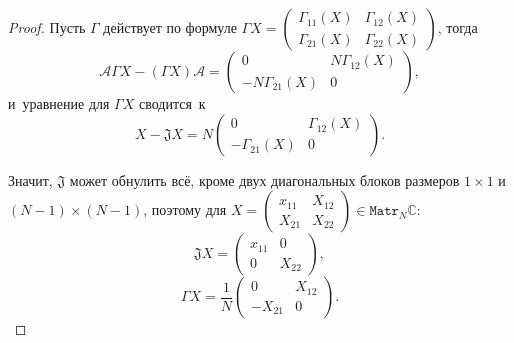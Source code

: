 \begin{proof}
Пусть \( \Gamma \) действует по формуле
\( \Gamma X = \begin{pmatrix} \Gamma_{11}(X) & \Gamma_{12}(X) \\
                              \Gamma_{21}(X) & \Gamma_{22}(X)
                              \end{pmatrix} \), тогда
\[
    \mathcal{A} \Gamma X - (\Gamma X)\mathcal{A} = 
    \begin{pmatrix} 0 & N\Gamma_{12}(X) \\
        - N\Gamma_{21}(X) & 0
        \end{pmatrix}, \]
и~уравнение для \( \Gamma X \) сводится~к
\[
    X - \mathfrak{J} X =
    N \begin{pmatrix} 0 & \Gamma_{12}(X) \\
        - \Gamma_{21}(X) & 0
        \end{pmatrix}. \]

Значит, \( \mathfrak{J} \) может обнулить вс\"е,
    кроме двух диагональных блоков размеров \( 1\times 1 \)
    и \( (N-1)\times(N-1) \),
поэтому для \( X =
    \begin{pmatrix}
    x_{11} & X_{12} \\
    X_{21} & X_{22}
    \end{pmatrix} \in \mathtt{Matr}_N\mathbb{C} \):
\[
    \mathfrak{J} X = \begin{pmatrix} x_{11} & 0 \\ 0 & X_{22} \end{pmatrix}, \]
\[
    \Gamma X = \frac{1}{N}\begin{pmatrix} 0 & X_{12} \\ -X_{21} & 0 \end{pmatrix}. \]
\end{proof}

